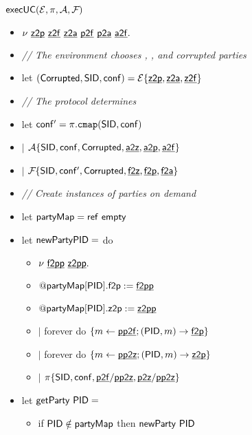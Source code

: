 \begin{figure}[h!]
\begin{boxedminipage}{\columnwidth}
\begin{centering}
\textbf{$\execUC{\Z}{\pi}{\A}{\F{}}$} \\
\end{centering}
\small
\begin{itemize}[leftmargin=2mm]
\item[] $\nu ~\chan{z2p}~ \chan{z2f}~ \chan{z2a}~ \chan{p2f}~ \chan{p2a}~ \chan{a2f}.$
\item[] \emph{// The environment chooses , , and corrupted parties}
\item[] let $(\msf{Corrupted},\msf{SID},\msf{conf}) = \Z\{\chan{z2p},\chan{z2a},\chan{z2f}\}$
\item[] \emph{// The protocol determines }
\item[] let $\msf{conf'} = \pi.\mtt{cmap}(\msf{SID},\msf{conf})$
\item[] $|$ $\A{}\{\msf{SID},\msf{conf},\msf{Corrupted},\chan{a2z},\chan{a2p},\chan{a2f}\}$
\item[] $|$ $\F{}\{\msf{SID},\msf{conf'},\msf{Corrupted},\chan{f2z},\chan{f2p},\chan{f2a}\}$
\item[] \emph{// Create instances of parties on demand}
\item[] let $\msf{partyMap} = \msf{ref}~\msf{empty}$
\item[] let $\msf{newParty} \msf{PID} = $ do
  \begin{itemize}[leftmargin=3mm]
  \item[] $\nu ~\chan{f2pp}~ \chan{z2pp}.$
  \item[] $@\msf{partyMap}[\msf{PID}].\msf{f2p} := \chan{f2pp}$
  \item[] $@\msf{partyMap}[\msf{PID}].\msf{z2p} := \chan{z2pp}$
  \item[] $|$ forever do $\{ m \leftarrow \chan{pp2f}; (\msf{PID},m) \rightarrow \chan{f2p}\}$
  \item[] $|$ forever do $\{ m \leftarrow \chan{pp2z}; (\msf{PID},m) \rightarrow \chan{z2p} \}$
  \item[] $|$ $\pi\{\msf{SID},\msf{conf},\chan{p2f}/\chan{pp2z},\chan{p2z}/\chan{pp2z}\}$
  \end{itemize}
\item[] let $\msf{getParty}~\msf{PID} =$
  \begin{itemize}
  \item[] if $\msf{PID} \notin \msf{partyMap}$ then $\msf{newParty}~\msf{PID}$

\end{itemize}
\end{itemize}
\end{boxedminipage}
\end{figure}
